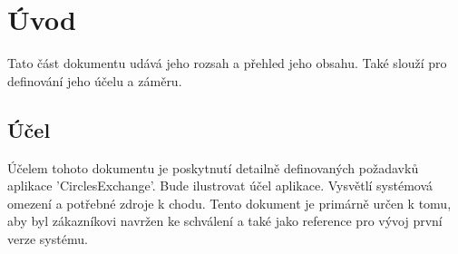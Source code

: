 \documentclass[FM,SP]{tulthesis}
\newcommand{\appName}{CirclesExchange}
\newcommand{\appNameQ}{'\appName'}
\begin{document}








\tableofcontents

\clearpage


\chapter{Úvod}
Tato část dokumentu udává jeho rozsah a přehled jeho obsahu. Také slouží pro definování jeho účelu a záměru.

\section{Účel}
Účelem tohoto dokumentu je poskytnutí detailně definovaných požadavků aplikace \appNameQ. Bude ilustrovat účel aplikace. Vysvětlí systémová omezení a potřebné zdroje k chodu. Tento dokument je primárně určen k tomu, aby byl zákazníkovi navržen ke schválení a také jako reference pro vývoj první verze systému.
\end{document}
